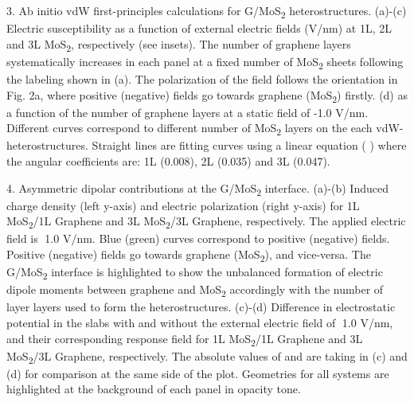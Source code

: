  3. Ab initio vdW first-principles calculations for G/MoS\textsubscript{2} heterostructures. (a)-(c) Electric susceptibility   as a function of external electric fields (V/nm) at 1L, 2L and 3L MoS\textsubscript{2}, respectively (see insets). The number of graphene layers systematically increases in each panel at a fixed number of MoS\textsubscript{2} sheets following the labeling shown in (a). The polarization of the field follows the orientation in Fig. 2a, where positive (negative) fields go towards graphene (MoS\textsubscript{2}) firstly.  (d)   as a function of the number of graphene layers at a static field of -1.0 V/nm. Different curves correspond to different number of MoS\textsubscript{2} layers on the each vdW-heterostructures. Straight lines are fitting curves using a linear equation ( ) where the angular coefficients   are: 1L (0.008), 2L (0.035) and 3L (0.047).  
 
 4. Asymmetric dipolar contributions at the G/MoS\textsubscript{2} interface. (a)-(b) Induced charge density   (left y-axis) and electric polarization   (right y-axis) for 1L MoS\textsubscript{2}/1L Graphene and 3L MoS\textsubscript{2}/3L Graphene, respectively. The applied electric field is 1.0 V/nm. Blue (green) curves correspond to positive (negative) fields. Positive (negative) fields go towards graphene (MoS\textsubscript{2}), and vice-versa. The G/MoS\textsubscript{2} interface is highlighted to show the unbalanced formation of electric dipole moments between graphene and MoS\textsubscript{2} accordingly with the number of layer layers used to form the heterostructures. (c)-(d) Difference in electrostatic potential  in the slabs with and without the external electric field of 1.0 V/nm, and their corresponding response field  for 1L MoS\textsubscript{2}/1L Graphene and 3L MoS\textsubscript{2}/3L Graphene, respectively. The absolute values of   and   are taking in (c) and (d) for comparison at the same side of the plot. Geometries for all systems are highlighted at the background of each panel in opacity tone.  
 
